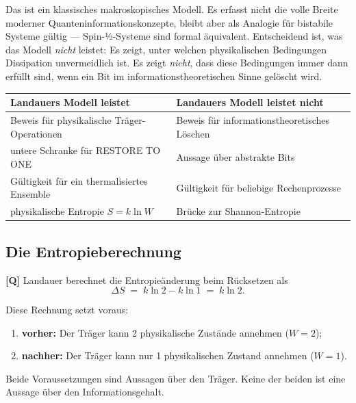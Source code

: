 Das ist ein klassisches makroskopisches Modell. Es erfasst nicht die volle Breite
moderner Quanteninformationskonzepte, bleibt aber als Analogie für bistabile
Systeme gültig --- Spin-½-Systeme sind formal äquivalent. Entscheidend ist, was
das Modell \emph{nicht} leistet: Es zeigt, unter welchen physikalischen
Bedingungen Dissipation unvermeidlich ist. Es zeigt \emph{nicht}, dass diese
Bedingungen immer dann erfüllt sind, wenn ein Bit im informationstheoretischen
Sinne gelöscht wird.

\begin{center}
\small
\begin{tabular}{@{}p{}p{}@{}}
\toprule
\textbf{Landauers Modell leistet} & \textbf{Landauers Modell leistet nicht} \\
\midrule
Beweis für physikalische Träger-Operationen & Beweis für informationstheoretisches Löschen \\
untere Schranke für \textup{RESTORE TO ONE} & Aussage über abstrakte Bits \\
Gültigkeit für ein thermalisiertes Ensemble & Gültigkeit für beliebige Rechenprozesse \\
physikalische Entropie $S = k\ln W$ & Brücke zur Shannon-Entropie \\
\bottomrule
\end{tabular}
\end{center}

\subsection{Die Entropieberechnung}

\textbf{[Q]} Landauer berechnet die Entropieänderung beim Rücksetzen als
\begin{equation}
  \Delta S \;=\; k \ln 2 - k \ln 1 \;=\; k \ln 2 .
  \label{eq:landauer}
\end{equation}

Diese Rechnung setzt voraus:
\begin{enumerate}[leftmargin=1.6em,itemsep=0.2em]
  \item \textbf{vorher:} Der Träger kann 2 physikalische Zustände annehmen ($W=2$);
  \item \textbf{nachher:} Der Träger kann nur 1 physikalischen Zustand annehmen
        ($W=1$).
\end{enumerate}

Beide Voraussetzungen sind Aussagen über den Träger. Keine der beiden ist eine
Aussage über den Informationsgehalt.

